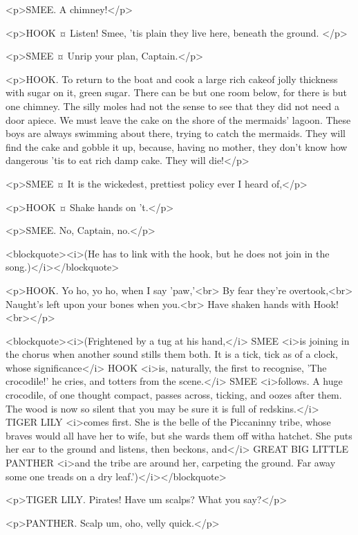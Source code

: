 <p>SMEE. A chimney!</p>

<p>HOOK ¤
Listen! Smee, 'tis plain they live here, beneath the ground.
</p>

<p>SMEE ¤
Unrip your plan, Captain.</p>

<p>HOOK. To return to the boat and cook a large rich cakeof jolly thickness with sugar on it, green sugar. There can be but one room below, for there is but one chimney. The silly moles had not the sense to see that they did not need a door apiece. We must leave the cake on the shore of the mermaids' lagoon. These boys are always swimming about there, trying to catch the mermaids. They will find the cake and gobble it up, because, having no mother, they don't know how dangerous 'tis to eat rich damp cake. They will die!</p>

<p>SMEE ¤
It is the wickedest, prettiest policy ever I heard of,</p>

<p>HOOK ¤
Shake hands on 't.</p>

<p>SMEE. No, Captain, no.</p>

<blockquote><i>(He has to link with the hook, but he does not join in the song.)</i></blockquote>

<p>HOOK. Yo ho, yo ho, when I say 'paw,'<br> By fear they're overtook,<br> Naught's left upon your bones when you.<br> Have shaken hands with Hook!<br></p>

<blockquote><i>(Frightened by a tug at his hand,</i> SMEE <i>is joining in the chorus when another sound stills them both. It is a tick, tick as of a clock, whose significance</i> HOOK <i>is, naturally, the first to recognise, 'The crocodile!' he cries, and totters from the scene.</i> SMEE <i>follows. A huge crocodile, of one thought compact, passes across, ticking, and oozes after them. The wood is now so silent that you may be sure it is full of redskins.</i> TIGER LILY <i>comes first. She is the belle of the Piccaninny tribe, whose braves would all have her to wife, but she wards them off witha hatchet. She puts her ear to the ground and listens, then beckons, and</i> GREAT BIG LITTLE PANTHER <i>and the tribe are around her, carpeting the ground. Far away some one treads on a dry leaf.')</i></blockquote>

<p>TIGER LILY. Pirates!
Have um scalps? What you say?</p>

<p>PANTHER. Scalp um, oho, velly quick.</p>

